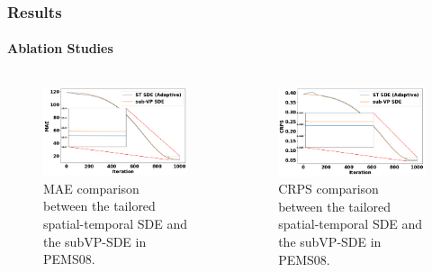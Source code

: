 \documentclass[light]{lutbeamer} %
\begin{document}
\begin{frame}
    \frametitle{Results}
    \framesubtitle{Ablation Studies}

    \begin{columns}
        \begin{column}{0.5\textwidth}
            \begin{figure}
                \centering
                \includegraphics[width=\textwidth]{figures/mae_stsde_subvpsde.png}
                \caption{MAE comparison between the tailored spatial-temporal SDE and the subVP-SDE in PEMS08.}
            \end{figure}
        \end{column}
        \begin{column}{0.5\textwidth}
            \begin{figure}
                \centering
                \includegraphics[width=\textwidth]{figures/crps_stsde_subvpsde.png}
                \caption{CRPS comparison between the tailored spatial-temporal SDE and the subVP-SDE in PEMS08.}
            \end{figure}
        \end{column}
    \end{columns}
\end{frame}
\end{document}
